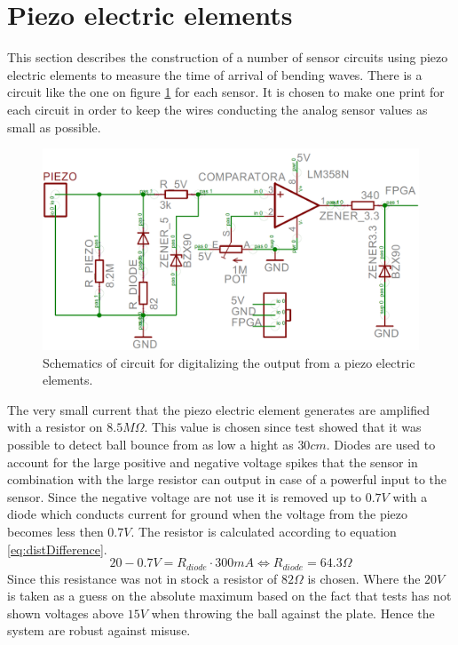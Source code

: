 \section{Piezo electric elements}
\label{piezo}
This section describes the construction of a number of sensor circuits using piezo electric elements to measure the time of arrival of bending waves.
There is a circuit like the one on figure \ref{fig:print} for each sensor. It is chosen to make one print for each circuit in order to keep the wires conducting the analog sensor values as small as possible. 
\begin{figure}[htb]
	\centering
	\includegraphics[width=1.\textwidth]{figures/print}
	\caption{Schematics of circuit for digitalizing the output from a piezo electric elements.}
	\label{fig:print}
\end{figure}
The very small current that the piezo electric element generates are amplified with a resistor on $8.5M\Omega$. This value is chosen since test showed that it was possible to detect ball bounce from as low a hight as $30\si{cm}$.
Diodes are used to account for the large positive and negative voltage spikes that the sensor in combination with the large resistor can output in case of a powerful input to the sensor. 
Since the negative voltage are not use it is removed up to $0.7V$ with a diode which conducts current for ground when the voltage from the piezo becomes less then $0.7V$.
The resistor is calculated according to equation \ref{eq:distDifference}.
\begin{equation}
 20 - 0.7 V = R_{diode} \cdot 300mA \Leftrightarrow R_{diode} = 64.3\Omega 
 \label{diodeResistor}
\end{equation}
Since this resistance was not in stock a resistor of $82 \si{\Omega}$ is chosen.
Where the $20V$ is taken as a guess on the absolute maximum based on the fact that tests has not shown voltages above $15V$ when throwing the ball against the plate. Hence the system are robust against misuse.
